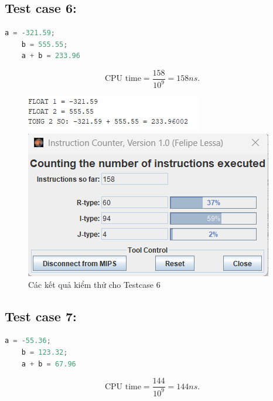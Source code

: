 \subsection{Test case 6:}
\begin{lstlisting}[language=Python]
    a = -321.59;
    b = 555.55;
    a + b = 233.96
\end{lstlisting}
\[
\text{CPU time} = \frac{\text{158}}{10^9} = 158 ns.
\]
\begin{figure}[!h]
    \centering
    \begin{minipage}[b]{0.48\textwidth}
        \centering
        \includegraphics[width=\textwidth]{image/TESTCASE/Testcase 6.png}
    \end{minipage}
    \hfill
    \begin{minipage}[b]{0.48\textwidth}
        \centering
        \includegraphics[width=\textwidth]{image/TESTCASE/Instruction Counter 6.png}
    \end{minipage}
    \vspace{0.5cm}
    \caption{Các kết quả kiểm thử cho Testcase 6}
\end{figure}


\vspace{0.5 cm}


\subsection{Test case 7:}
\begin{lstlisting}[language=Python]
    a = -55.36;
    b = 123.32;
    a + b = 67.96
\end{lstlisting}
\[
\text{CPU time} = \frac{\text{144}}{10^9} = 144ns.
\]

